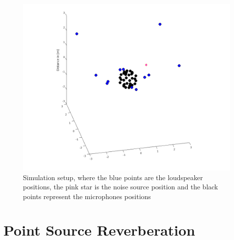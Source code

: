 \begin{figure}
    \centerline{\includegraphics[width=\paperwidth]{LaTeX/images/plots/ANCSetup.png}}
    \caption{Simulation setup, where the blue points are the loudspeaker positions, the pink star is the noise source position and the black points represent the microphones positions}
    \label{fig:setup}
\end{figure}

\section{Point Source Reverberation}
